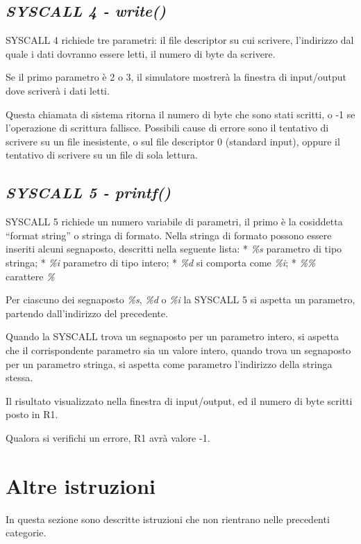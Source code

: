 \documentclass[letterpaper,10pt,english]{sphinxmanual}
\begin{document}
\subsection{\emph{SYSCALL 4 - write()}}
\label{instructions:syscall-4-write}
SYSCALL 4 richiede tre parametri: il file descriptor su cui scrivere,
l'indirizzo dal quale i dati dovranno essere letti, il numero di byte da
scrivere.

Se il primo parametro è 2 o 3, il simulatore mostrerà la finestra di
input/output dove scriverà i dati letti.

Questa chiamata di sistema ritorna il numero di byte che sono stati scritti, o
-1 se l'operazione di scrittura fallisce.  Possibili cause di errore sono il
tentativo di scrivere su un file inesistente, o sul file descriptor 0
(standard input), oppure il tentativo di scrivere su un file di sola lettura.


\subsection{\emph{SYSCALL 5 - printf()}}
\label{instructions:syscall-5-printf}
SYSCALL 5 richiede un numero variabile di parametri, il primo è la
cosiddetta ``format string'' o stringa di formato. Nella stringa di formato
possono essere inseriti alcuni segnaposto, descritti nella seguente lista:
* \emph{\%s} parametro di tipo stringa;
* \emph{\%i} parametro di tipo intero;
* \emph{\%d} si comporta come \emph{\%i};
* \emph{\%\%} carattere \emph{\%}

Per ciascuno dei segnaposto \emph{\%s}, \emph{\%d} o \emph{\%i} la SYSCALL 5
si aspetta un parametro, partendo dall'indirizzo del precedente.

Quando la SYSCALL trova un segnaposto per un parametro intero, si aspetta che
il corrispondente parametro sia un valore intero, quando trova un segnaposto
per un parametro stringa, si aspetta come parametro l'indirizzo della stringa
stessa.

Il risultato  visualizzato nella finestra di input/output, ed il numero di
byte scritti posto in R1.

Qualora si verifichi un errore, R1 avrà valore -1.


\section{Altre istruzioni}
\label{instructions:altre-istruzioni}
In questa sezione sono descritte istruzioni che non rientrano nelle precedenti
categorie.
\end{document}
